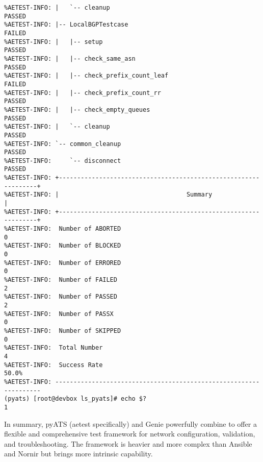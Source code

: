 \begin{verbatim}
%AETEST-INFO: |   `-- cleanup                                             PASSED
%AETEST-INFO: |-- LocalBGPTestcase                                        FAILED
%AETEST-INFO: |   |-- setup                                               PASSED
%AETEST-INFO: |   |-- check_same_asn                                      PASSED
%AETEST-INFO: |   |-- check_prefix_count_leaf                             FAILED
%AETEST-INFO: |   |-- check_prefix_count_rr                               PASSED
%AETEST-INFO: |   |-- check_empty_queues                                  PASSED
%AETEST-INFO: |   `-- cleanup                                             PASSED
%AETEST-INFO: `-- common_cleanup                                          PASSED
%AETEST-INFO:     `-- disconnect                                          PASSED
%AETEST-INFO: +----------------------------------------------------------------+
%AETEST-INFO: |                                   Summary                      |
%AETEST-INFO: +----------------------------------------------------------------+
%AETEST-INFO:  Number of ABORTED                                              0
%AETEST-INFO:  Number of BLOCKED                                              0
%AETEST-INFO:  Number of ERRORED                                              0
%AETEST-INFO:  Number of FAILED                                               2
%AETEST-INFO:  Number of PASSED                                               2
%AETEST-INFO:  Number of PASSX                                                0
%AETEST-INFO:  Number of SKIPPED                                              0
%AETEST-INFO:  Total Number                                                   4
%AETEST-INFO:  Success Rate                                               50.0%
%AETEST-INFO: ------------------------------------------------------------------
(pyats) [root@devbox ls_pyats]# echo $?
1
\end{verbatim}

In summary, pyATS (aetest specifically) and Genie powerfully combine to offer a
flexible and comprehensive test framework for network configuration, validation,
and troubleshooting. The framework is heavier and more complex than Ansible and
Nornir but brings more intrinsic capability.

